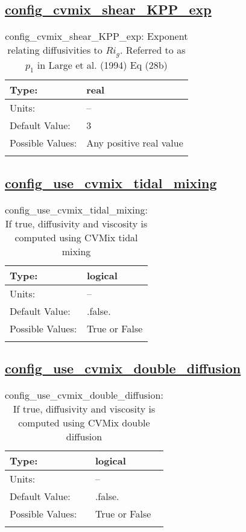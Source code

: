 \subsection[config\_cvmix\_shear\_KPP\_exp]{\hyperref[sec:nm_tab_cvmix]{config\_cvmix\_shear\_KPP\_exp}}
\label{subsec:nm_sec_config_cvmix_shear_KPP_exp}
\begin{center}
\begin{longtable}{| p{2.0in} || p{4.0in} |}
    \hline
    Type: & real \\
    \hline
    Units: & -- \\
    \hline
    Default Value: & 3 \\
    \hline
    Possible Values: & Any positive real value \\
    \hline
    \caption{config\_cvmix\_shear\_KPP\_exp: Exponent relating diffusivities to $Ri_g$. Referred to as $p_1$ in Large et al. (1994) Eq (28b)}
\end{longtable}
\end{center}
\subsection[config\_use\_cvmix\_tidal\_mixing]{\hyperref[sec:nm_tab_cvmix]{config\_use\_cvmix\_tidal\_mixing}}
\label{subsec:nm_sec_config_use_cvmix_tidal_mixing}
\begin{center}
\begin{longtable}{| p{2.0in} || p{4.0in} |}
    \hline
    Type: & logical \\
    \hline
    Units: & -- \\
    \hline
    Default Value: & .false. \\
    \hline
    Possible Values: & True or False \\
    \hline
    \caption{config\_use\_cvmix\_tidal\_mixing: If true, diffusivity and viscosity is computed using CVMix tidal mixing}
\end{longtable}
\end{center}
\subsection[config\_use\_cvmix\_double\_diffusion]{\hyperref[sec:nm_tab_cvmix]{config\_use\_cvmix\_double\_diffusion}}
\label{subsec:nm_sec_config_use_cvmix_double_diffusion}
\begin{center}
\begin{longtable}{| p{2.0in} || p{4.0in} |}
    \hline
    Type: & logical \\
    \hline
    Units: & -- \\
    \hline
    Default Value: & .false. \\
    \hline
    Possible Values: & True or False \\
    \hline
    \caption{config\_use\_cvmix\_double\_diffusion: If true, diffusivity and viscosity is computed using CVMix double diffusion}
\end{longtable}
\end{center}
